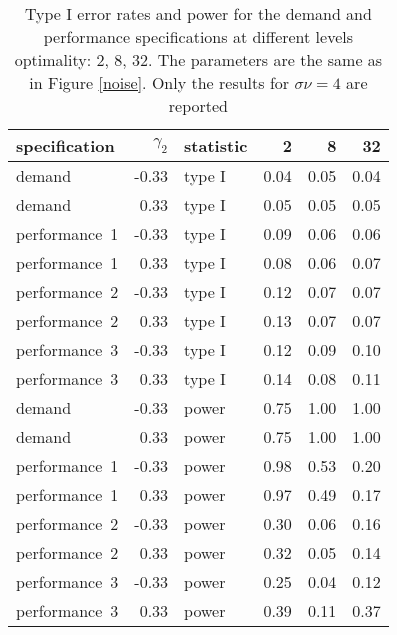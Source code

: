 \begin{table}[ht]
\centering
\begingroup\footnotesize
\begin{tabular}{lrlrrr}
  \hline
specification & $\gamma_2$ & statistic & 2 & 8 & 32 \\ 
  \hline
demand & -0.33 & type I & 0.04 & 0.05 & 0.04 \\ 
  demand & 0.33 & type I & 0.05 & 0.05 & 0.05 \\ 
  performance~1 & -0.33 & type I & 0.09 & 0.06 & 0.06 \\ 
  performance~1 & 0.33 & type I & 0.08 & 0.06 & 0.07 \\ 
  performance~2 & -0.33 & type I & 0.12 & 0.07 & 0.07 \\ 
  performance~2 & 0.33 & type I & 0.13 & 0.07 & 0.07 \\ 
  performance~3 & -0.33 & type I & 0.12 & 0.09 & 0.10 \\ 
  performance~3 & 0.33 & type I & 0.14 & 0.08 & 0.11 \\ 
  demand & -0.33 & power & 0.75 & 1.00 & 1.00 \\ 
  demand & 0.33 & power & 0.75 & 1.00 & 1.00 \\ 
  performance~1 & -0.33 & power & 0.98 & 0.53 & 0.20 \\ 
  performance~1 & 0.33 & power & 0.97 & 0.49 & 0.17 \\ 
  performance~2 & -0.33 & power & 0.30 & 0.06 & 0.16 \\ 
  performance~2 & 0.33 & power & 0.32 & 0.05 & 0.14 \\ 
  performance~3 & -0.33 & power & 0.25 & 0.04 & 0.12 \\ 
  performance~3 & 0.33 & power & 0.39 & 0.11 & 0.37 \\ 
   \hline
\end{tabular}
\endgroup
\caption{Type I error rates and power for the demand and
             performance specifications at different levels optimality: 
             2, 8, 32. The parameters are the same as in Figure \ref{noise}.
             Only the results for $\sigma{\nu} = 4$ are reported} 
\label{noise-table}
\end{table}
